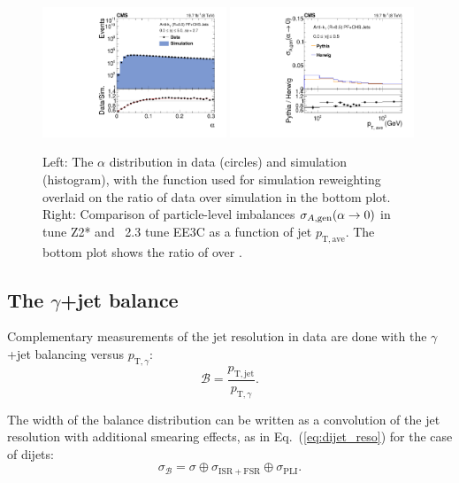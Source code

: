 \documentclass[11pt,twoside,a4paper,cmspaper,final,collab]{cms-tdr}
\begin{document}
\begin{figure}[htbp!]
\centering
\includegraphics[width=0.49\textwidth]{Figure_042-a.pdf}
\includegraphics[width=0.49\textwidth]{Figure_042-b.pdf}
\caption{\label{fig:alpha_herwig}
Left: The $\alpha$ distribution in data (circles) and simulation (histogram), with the function used for simulation reweighting overlaid on the ratio of data over simulation in the bottom plot.
Right: Comparison of particle-level imbalances $\sigma_{A,\rm gen}(\alpha\to 0)$ in  tune Z2* and \HERWIGpp~2.3 tune EE3C as a function of jet $p_\mathrm{T,ave}$. The bottom plot shows the ratio of {\PYTHIA} over {\HERWIG}.
}
\end{figure}

\subsection{The \texorpdfstring{$\gamma$}{gamma}+jet balance}

Complementary measurements of the jet \pt resolution in data are done with the $\gamma$+jet balancing versus $p_{\mathrm{T},\gamma}$:
\begin{equation}
\mathcal{B} = \frac{p_\mathrm{T,jet}}{p_{\mathrm{T},\gamma}}.
\end{equation}

The width of the balance distribution can be written as a convolution of the jet \pt resolution with additional smearing effects, as in Eq.~(\ref{eq:dijet_reso}) for the case of dijets:
\begin{equation}
\sigma_{\mathcal B} = \sigma \oplus \sigma_\mathrm{ISR+FSR} \oplus \sigma_\mathrm{PLI}.
\end{equation}
\end{document}
